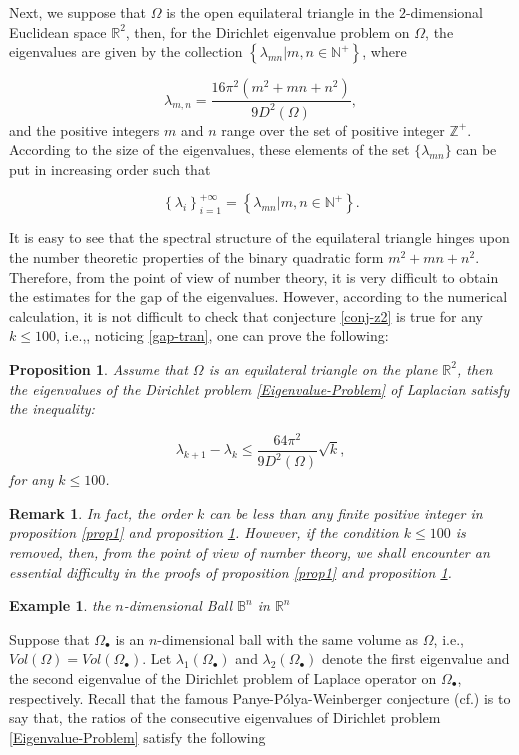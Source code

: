 \documentclass[12pt]{article}
\newtheorem{exa}{Example}[section]
\newtheorem{prop}[thm]{Proposition}
\newtheorem{rem}[thm]{Remark}
\numberwithin{equation}{section}
\begin{document}
Next, we suppose that  $\Omega$ is the open equilateral triangle in the $2$-dimensional Euclidean space $\mathbb{R}^{2}$,
then, for the Dirichlet  eigenvalue problem on $\Omega$, the eigenvalues are given
by the collection $\left\{\lambda_{mn}|m,n\in\mathbb{N}^{+}\right\}$, where

\begin{equation}\label{trang}\lambda_{m,n}=\frac{16\pi^{2}(m^{2} + mn + n^{2})}{9D^{2}(\Omega)},\end{equation}
and the positive integers $m$ and $n$ range  over the set of positive integer $\mathbb{Z}^{+}$.  According to the
size of the eigenvalues, these elements of the set $\{\lambda_{mn}\}$ can be put in increasing order such that

$$\left\{\lambda_{i}\right\}_{i=1}^{+\infty}=\left\{\lambda_{mn}|m,n\in\mathbb{N}^{+}\right\}.$$

It is easy to  see that the spectral structure of the equilateral triangle hinges upon the number
theoretic properties of the binary quadratic form $m^{2}+mn+n^{2}$. Therefore, from the point of
view of number theory, it is very difficult to obtain the estimates for the gap of the eigenvalues.
However, according to the numerical calculation, it is not difficult to check that conjecture \ref{conj-z2} is
true for any $k\leq100$, i.e.,, noticing \eqref{gap-tran}, one can prove the following:

\begin{prop} \label{prop2}
Assume that  $\Omega$ is an equilateral triangle on the plane $\mathbb{R}^{2}$, then the eigenvalues of the Dirichlet
problem \eqref{Eigenvalue-Problem} of Laplacian satisfy the inequality:


\begin{equation}\label{con-z1}\lambda_{k+1}-\lambda_{k}\leq\frac{64\pi^{2}}{9D^{2}(\Omega)}\sqrt{k},
\end{equation}
for any $k\leq100$. \end{prop}

\begin{rem}In fact, the order $k$ can be less than any finite positive integer in proposition \ref{prop1} and
proposition \ref{prop2}. However, if the condition $k\leq100$ is removed, then, from the point of view of number theory, we shall encounter an essential difficulty in the proofs of
proposition \ref{prop1} and proposition \ref{prop2}.\end{rem}

\begin{exa}the $n$-dimensional Ball $\mathbb{B}^{n}$ in $\mathbb{R}^{n}$
\end{exa}
Suppose that $\Omega_{\bullet}$ is an $n$-dimensional ball with the same volume as $\Omega$, i.e., $Vol(\Omega)=Vol(\Omega_{\bullet})$. Let $\lambda_{1}(\Omega_{\bullet})$ and $\lambda_{2}(\Omega_{\bullet})$ denote the first eigenvalue and the second eigenvalue of the Dirichlet problem of
Laplace operator on $\Omega_{\bullet}$, respectively. Recall that the famous Panye-P\'{o}lya-Weinberger conjecture (cf.\cite{Ash5,Ash6,PPW1,PPW2,T}) is to say
that, the ratios of the consecutive eigenvalues of Dirichlet  problem \eqref{Eigenvalue-Problem} satisfy the following
\end{document}
